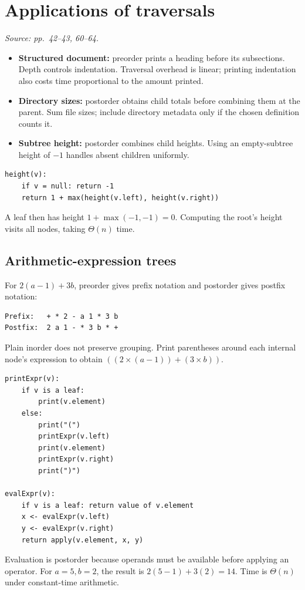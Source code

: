 \documentclass[11pt]{article}
\begin{document}
\section{Applications of traversals}
\textit{Source: pp.\ 42--43, 60--64.}
\begin{itemize}
\item \textbf{Structured document:} preorder prints a heading before its subsections. Depth controls indentation. Traversal overhead is linear; printing indentation also costs time proportional to the amount printed.
\item \textbf{Directory sizes:} postorder obtains child totals before combining them at the parent. Sum file sizes; include directory metadata only if the chosen definition counts it.
\item \textbf{Subtree height:} postorder combines child heights. Using an empty-subtree height of $-1$ handles absent children uniformly.
\end{itemize}
\begin{lstlisting}
height(v):
    if v = null: return -1
    return 1 + max(height(v.left), height(v.right))
\end{lstlisting}
A leaf then has height $1+\max(-1,-1)=0$. Computing the root's height visits all nodes, taking $\Theta(n)$ time.

\subsection{Arithmetic-expression trees}
For $2(a-1)+3b$, preorder gives prefix notation and postorder gives postfix notation:
\begin{lstlisting}
Prefix:   + * 2 - a 1 * 3 b
Postfix:  2 a 1 - * 3 b * +
\end{lstlisting}
Plain inorder does not preserve grouping. Print parentheses around each internal node's expression to obtain $((2\times(a-1))+(3\times b))$.
\begin{lstlisting}
printExpr(v):
    if v is a leaf:
        print(v.element)
    else:
        print("(")
        printExpr(v.left)
        print(v.element)
        printExpr(v.right)
        print(")")

evalExpr(v):
    if v is a leaf: return value of v.element
    x <- evalExpr(v.left)
    y <- evalExpr(v.right)
    return apply(v.element, x, y)
\end{lstlisting}
Evaluation is postorder because operands must be available before applying an operator. For $a=5,b=2$, the result is $2(5-1)+3(2)=14$. Time is $\Theta(n)$ under constant-time arithmetic.
\end{document}
